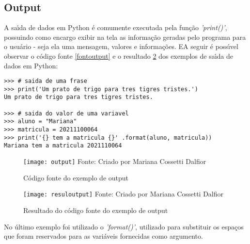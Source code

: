 \subsection{Output}

A sa\'{\i}da de dados em Python \'{e} comumente executada pela fun\c{c}\~{a}o \textsl{'print()'}, possuindo como encargo exibir na tela as informa\c{c}\~{a}o geradas pelo programa para o usu\'{a}rio - seja ela uma mensagem, valores e informa\c{c}\~{o}es. EA seguir \'{e} poss\'{\i}vel observar o c\'{o}digo fonte \ref{fontoutput} e o resultado \ref{resuloutput} dos exemplos de sa\'{\i}da de dados em Python:

\begin{lstlisting}
>>> # saida de uma frase
>>> print('Um prato de trigo para tres tigres tristes.')
Um prato de trigo para tres tigres tristes.

>>> # saida do valor de uma variavel
>>> aluno = "Mariana"
>>> matricula = 20211100064
>>> print('{} tem a matricula {}' .format(aluno, matricula))
Mariana tem a matricula 2021110064
\end{lstlisting}

\begin{figure}[H]
	\begin{center}
		\caption{C\'{o}digo fonte do exemplo de output} \label{fonteoutput}
		\texttt{[image: output]} 
		\newline
		Fonte: Criado por Mariana Cossetti Dalfior
	\end{center}
\end{figure}

\begin{figure}[H]
	\begin{center}
		\caption{Resultado do c\'{o}digo fonte do exemplo de output} \label{resuloutput}
		\texttt{[image: resuloutput]} 
		\newline
		Fonte: Criado por Mariana Cossetti Dalfior
	\end{center}
\end{figure}
	
No \'{u}ltimo exemplo foi utilizado o \textsl{'format()'}, utilizado para substituir os espa\c{c}os que foram reservados para as vari\'{a}veis fornecidas como argumento.


